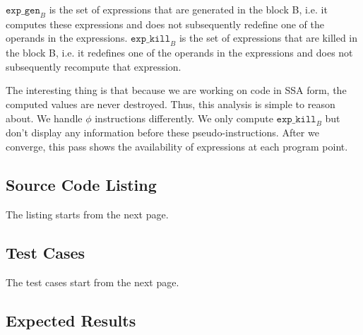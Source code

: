 $\texttt{exp\_gen}_{B}$ is the set of expressions that are generated in the block B, i.e. it computes these
expressions and does not subsequently redefine one of the operands in the expressions.
$\texttt{exp\_kill}_{B}$ is the set of expressions that are killed in the block B, i.e. it
redefines one of the operands in the expressions and does not subsequently recompute that expression.

The interesting thing is that because we are working on code in SSA form, the computed values are never
destroyed. Thus, this analysis is simple to reason about.
We handle $\phi$ instructions differently. We only compute $\texttt{exp\_kill}_{B}$ but don't display any
information before these pseudo-instructions.
After we converge, this pass shows the availability of expressions at each program point.

\subsection{Source Code Listing}

The listing starts from the next page.



\subsection{Test Cases}

The test cases start from the next page.



\subsection{Expected Results}

